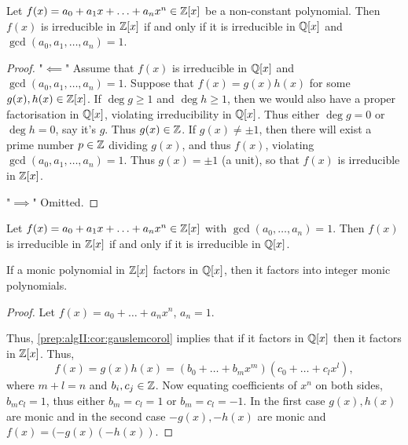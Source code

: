 \documentclass[10pt, a4paper]{article}
\begin{document}
\begin{theorem}\label{prep:algII:thm:guasslem}
    Let $f(x) = a_0 + a_1x + \dotsc + a_nx ^ n \in \mathbb{Z}[x]$ be a non-constant polynomial.
    Then $f(x)$ is irreducible in $\mathbb{Z}[x]$ if and only if it is irreducible in $\mathbb{Q}[x]$ and $\gcd(a_0, a_1, \dotsc, a_n) = 1$.

    \begin{proof}
        "$\impliedby$"
        Assume that $f(x)$ is irreducible in $\mathbb{Q}[x]$ and $\gcd(a_0, a_1, \dotsc, a_n) = 1$.
        Suppose that $f(x) = g(x)h(x)$ for some $g(x), h(x) \in \mathbb{Z}[x]$.
        If $\deg{g} \geq 1$ and $\deg{h} \geq 1$,
        then we would also have a proper factorisation in $\mathbb{Q}[x]$,
        violating irreducibility in $\mathbb{Q}[x]$.
        Thus either $\deg{g} = 0$ or $\deg{h} = 0$,
        say it's $g$.
        Thus $g(x) \in \mathbb{Z}$.
        If $g(x) \neq \pm 1$,
        then there will exist a prime number $p \in \mathbb{Z}$ dividing $g(x)$,
        and thus $f(x)$,
        violating $\gcd(a_0, a_1, \dotsc, a_n) = 1$.
        Thus $g(x) = \pm 1$
        (a unit),
        so that $f(x)$ is irreducible in $\mathbb{Z}[x]$.

        "$\implies$"
        Omitted.
    \end{proof}
\end{theorem}

\begin{corollary}\label{prep:algII:cor:gauslemcorol}
    Let $f(x) = a_0 + a_1x + \dotsc + a_nx ^ n \in \mathbb{Z}[x]$ with $\gcd(a_0, \dotsc, a_n) = 1$.
    Then $f(x)$ is irreducible in $\mathbb{Z}[x]$ if and only if it is irreducible in $\mathbb{Q}[x]$.
\end{corollary}

\begin{lemma}
    If a monic polynomial in $\mathbb{Z}[x]$ factors in $\mathbb{Q}[x]$,
    then it factors into integer monic polynomials.

    \begin{proof}
        Let $f(x) = a_0 + \dotsc + a_nx ^ n$,
        $a_n = 1$.

        Thus,
        \autoref{prep:algII:cor:gauslemcorol} implies that if it factors in $\mathbb{Q}[x]$ then it factors in $\mathbb{Z}[x]$.
        Thus,
        \[
        f(x) = g(x)h(x) = (b_0 + \dotsc + b_mx ^ m)(c_0 + \dotsc + c_lx ^ l),
        \]
        where $m + l = n$ and $b_i, c_j \in \mathbb{Z}$.
        Now equating coefficients of $x ^ n$ on both sides,
        $b_mc_l = 1$,
        thus either $b_m = c_l = 1$ or $b_m = c_l = -1$.
        In the first case $g(x), h(x)$ are monic and in the second case $-g(x), -h(x)$ are monic and $f(x) = (-g(x)(-h(x))$.
    \end{proof}
\end{lemma}
\end{document}
